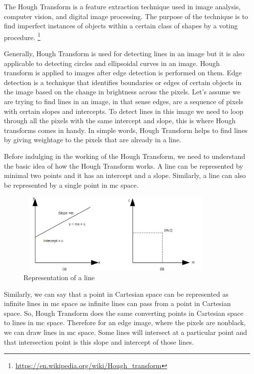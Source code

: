    The Hough Transform is a feature extraction technique used in image analysis, computer vision, and digital image processing. The purpose of the technique is to find imperfect instances of objects within a certain class of shapes by a voting procedure. \footnote{\url{https://en.wikipedia.org/wiki/Hough_transform}}
    
    Generally, Hough Transform is used for detecting lines in an image but it is also applicable to detecting circles and ellipsoidal curves in an image. Hough transform is applied to images after edge detection is performed on them. Edge detection is a technique that identifies boundaries or edges of certain objects in the image based on the change in brightness across the pixels. Let's assume we are trying to find lines in an image, in that sense edges, are a sequence of pixels with certain slopes and intercepts. To detect lines in this image we need to loop through all the pixels with the same intercept and slope, this is where Hough transforms comes in handy. In simple words, Hough Transform helps to find lines by giving weightage to the pixels that are already in a line. 
    
    Before indulging in the working of the Hough Transform, we need to understand the basic idea of how the Hough Transform works. A line can be represented by minimal two points and it has an intercept and a slope. Similarly, a line can also be represented by a single point in mc space.
    
                \begin{figure}[h]
    \centering
    \includegraphics[width=10cm, height =4cm]{images/hough1.png}
    \caption{Representation of a line}
    \end{figure}
    
    Similarly, we can say that a point in Cartesian space can be represented as infinite lines in mc space as infinite lines can pass from a point in Cartesian space. So, Hough Transform does the same converting points in Cartesian space to lines in mc space. Therefore for an edge image, where the pixels are nonblack, we can draw lines in mc space. Some lines will intersect at a particular point and that intersection point is this slope and intercept of those lines. 
    
